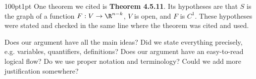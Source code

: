 \documentclass{exam}
\begin{document}
\bigskip
{}

\begin{answer}{100pt}{1pt} %
    One theorem we cited is \textbf{Theorem 4.5.11}.
    Its hypotheses are that $S$ is the graph of a function $F : V \rightarrow \R^{n - k}$, $V$ is open, and $F$ is $C^1$.
    These hypotheses were stated and checked in the same line where the theorem was cited and used.
\end{answer}

\bigskip


\medskip
\CorrectChoiceCircle
\begin{checkboxes} \sffamily
	\choice Does our argument have all the main ideas?
	\choice Did we state everything precisely, e.g. variables, quantifiers, definitions?
	\CorrectChoice Does our argument have an easy-to-read logical flow?
	\choice Do we use proper notation and terminology?
	\choice Could we add more justification somewhere?  
\end{checkboxes}

\vfill


\pagebreak
\end{document}
